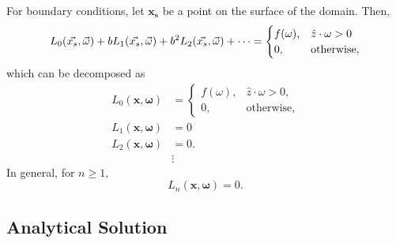 \documentclass[ms,cpyr,lof,lot]{uathesis}
\renewcommand\vec\bm
\begin{document}
For boundary conditions, let $\vec{x_s}$ be a point on the surface of the domain.
Then, 
\begin{equation*}
  \Lasyms =
  \begin{cases}
    f(\omega), & \hat{z}\cdot\omega > 0 \\
    0, & \mbox{otherwise},
  \end{cases}
\end{equation*}
which can be decomposed as
\begin{align}
  L_0(\vec{x}, \vec{\omega}) &=
  \begin{cases}
    f(\omega), & \hat{z}\cdot\omega > 0, \\
    0, & \mbox{otherwise},
  \end{cases}
  \label{eqn:asymptotics_bc_0} \\
  L_1(\vec{x}, \vec{\omega}) &= 0 \nonumber \\
  L_2(\vec{x}, \vec{\omega}) &= 0. \nonumber \\
  &\vdots \nonumber
\end{align}
In general, for $n \geq 1$,
\begin{equation}
  L_n(\vec{x}, \vec{\omega}) = 0.
  \label{eqn:asymptotics_bc_n}
\end{equation}

 
\subsection{Analytical Solution}
\label{sec:asymptotic_sol}
\end{document}
